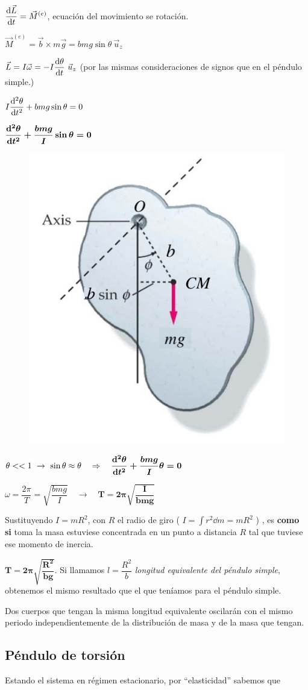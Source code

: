 {\begin{multicols}{2}
$\displaystyle \dv{\vec L}{t}=\vec M^{(e)}$, ecuación del movimiento se rotación.	

$\vec M^{(e)}=\vec b \times m\vec g=bmg\sin\theta \ \vec u_z$

$\vec L=I\vec \omega= -I \displaystyle \dv{\theta}{t} \ \vec u_z$ \textcolor{gris}{(por las mismas consideraciones de signos que en el péndulo simple.)}

$\displaystyle I \dv[2]{\theta}{t} + bmg\sin \theta=0$

$\boldsymbol{ \displaystyle \dv[2]{\theta}{t}+\dfrac{bmg}{I} \sin \theta =0 }$
\begin{figure}[H]
		\centering
		\includegraphics[width=.4\textwidth]{imagenes/imagenes19/T19IM07.png}
	\end{figure}	
\end{multicols}

$\theta << 1 \ \to \ \sin \theta \approx \theta \quad \Rightarrow \quad \boldsymbol{ \displaystyle \dv[2]{\theta}{t}+\dfrac{bmg}{I}  \theta =0 }$

$\omega=\dfrac{2\pi}{T}=\sqrt{\dfrac{bmg}{I}} \quad \to \quad \boldsymbol{ T=2\pi \sqrt{\dfrac{I}{bmg}}}$

Sustituyendo $I=mR^2$, con $R$ el radio de giro \textcolor{gris}{ ( $I=\int r^2 \dd m = m R^2$ ) }, es \textbf{como si} toma la masa estuviese concentrada en un punto a distancia $R$ tal que tuviese ese momento de inercia.

$ \boldsymbol{ T=2\pi \sqrt{ \dfrac{R^2}{bg} } }$. Si llamamos $l=\dfrac{R^2}{b}$ \emph{longitud equivalente del péndulo simple}, obtenemos el mismo resultado que el que teníamos para el péndulo simple.

Dos cuerpos que tengan la misma longitud equivalente oscilarán con el mismo periodo independientemente de la distribución de masa y de la masa que tengan.

 
\subsection{Péndulo de torsión}
\begin{multicols}{2}
Estando el sistema en régimen estacionario, por ``elasticidad'' sabemos que 


\end{multicols}}
